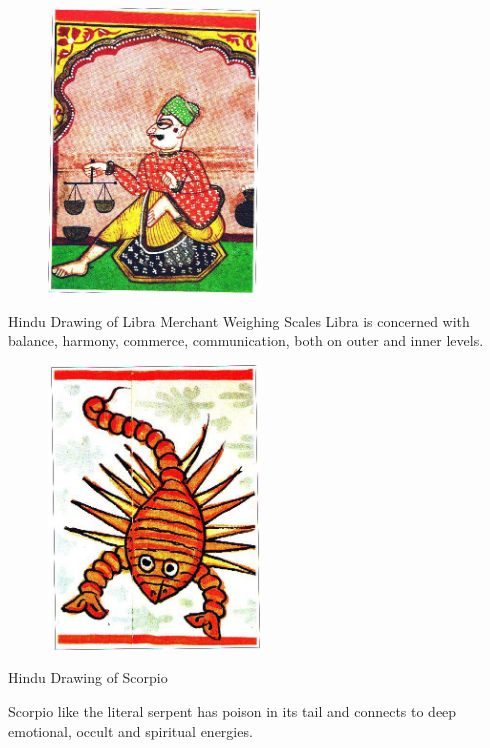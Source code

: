  
\begin{figure}[H]
 \centering
\includegraphics[width=0.5\textwidth]{pics/Libra.png}
 \end{figure}


 

Hindu Drawing of Libra
Merchant Weighing Scales
Libra is concerned with balance, harmony, commerce, communication, both on outer and inner levels.

 

\begin{figure}[H]
 \centering
\includegraphics[width=0.5\textwidth]{pics/Scorpio.png}
 \end{figure}

 

Hindu Drawing of Scorpio

Scorpio like the literal serpent has poison in its tail and connects to deep emotional, occult and spiritual energies.


